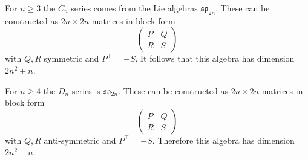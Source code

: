 For $n\ge 3$ the $C_n$ series
comes from the Lie algebras
$\mathfrak{sp}_{2n}$.
These can be constructed as $2n\times2n$ matrices
in block form 
$$
\left(\begin{array}{ll}
P & Q \\
R & S
\end{array}\right)
$$
with 
$Q,R$ symmetric and $P^{\top}=-S.$
It follows that this algebra has dimension $2n^2 + n.$

For $n\ge 4$ the $D_n$ series
is $\mathfrak{so}_{2n}$.
These can be constructed as $2n\times2n$ matrices
in block form 
$$
\left(\begin{array}{ll}
P & Q \\
R & S
\end{array}\right)
$$
with $Q,R$ anti-symmetric and $P^{\top}=-S.$
Therefore this algebra has dimension $2n^2 - n.$

%
%
%

